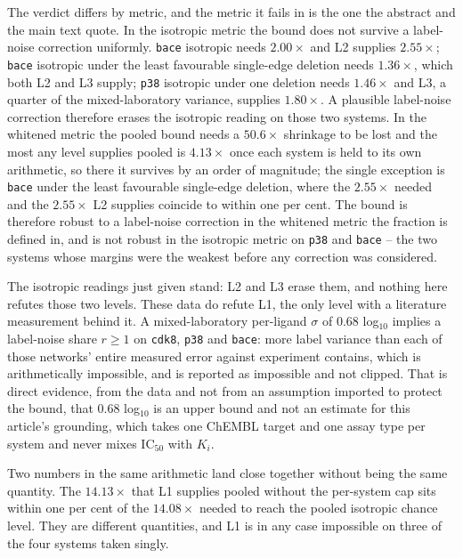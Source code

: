 The verdict differs by metric, and the metric it fails in is the one the abstract and the main text
quote. In the isotropic metric the bound does not survive a label-noise correction uniformly.
\texttt{bace} isotropic needs $2.00\times$ and L2 supplies $2.55\times$; \texttt{bace} isotropic
under the least favourable single-edge deletion needs $1.36\times$, which both L2 and L3 supply;
\texttt{p38} isotropic under one deletion needs $1.46\times$ and L3, a quarter of the
mixed-laboratory variance, supplies $1.80\times$. A plausible label-noise correction therefore
erases the isotropic reading on those two systems. In the whitened metric the pooled bound needs a
$50.6\times$ shrinkage to be lost and the most any level supplies pooled is $4.13\times$ once each
system is held to its own arithmetic, so there it survives by an order of magnitude; the single
exception is \texttt{bace} under the least favourable single-edge deletion, where the
$2.55\times$ needed and the $2.55\times$ L2 supplies coincide to within one per cent. The bound is therefore
robust to a label-noise correction in the whitened metric the fraction is defined in, and is not
robust in the isotropic metric on \texttt{p38} and \texttt{bace} -- the two systems whose margins
were the weakest before any correction was considered.

The isotropic readings just given stand: L2 and L3 erase them, and nothing here refutes those two
levels. These data do refute L1, the only level with a literature measurement behind it. A
mixed-laboratory per-ligand $\sigma$ of $0.68$ log$_{10}$ implies a label-noise share $r\ge1$ on
\texttt{cdk8}, \texttt{p38} and \texttt{bace}: more label variance than each of those networks'
entire measured error against experiment contains, which is arithmetically impossible, and is
reported as impossible and not clipped. That is direct evidence, from the data and not from an
assumption imported to protect the bound, that $0.68$ log$_{10}$ is an upper bound and not an
estimate for this article's grounding, which takes one ChEMBL target and one assay type per system
and never mixes $\mathrm{IC}_{50}$ with $K_i$.

Two numbers in the same arithmetic land close together without being the same quantity. The
$14.13\times$ that L1 supplies pooled without the per-system cap sits within one per cent of the
$14.08\times$ needed to reach the pooled isotropic chance level. They are different quantities, and
L1 is in any case impossible on three of the four systems taken singly.

